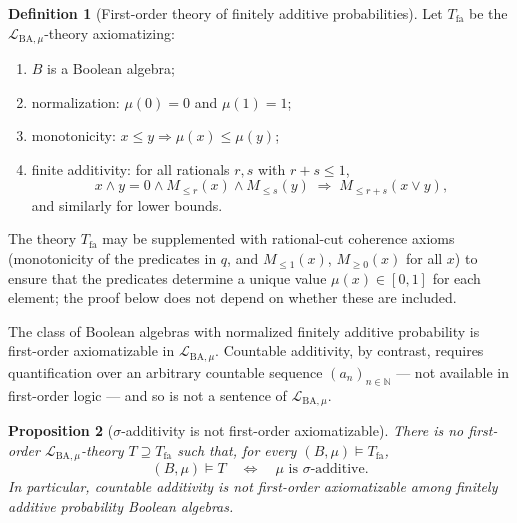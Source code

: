 \documentclass[11pt]{article}
\newtheorem{proposition}{Proposition}
\theoremstyle{definition}
\newtheorem{definition}[proposition]{Definition}
\newcommand{\Lmu}{\mathcal{L}_{\mathrm{BA},\mu}}
\newcommand{\Tfa}{T_{\mathrm{fa}}}
\newcommand{\N}{\mathbb{N}}
\begin{document}
\begin{definition}[First-order theory of finitely additive probabilities]
Let $\Tfa$ be the $\Lmu$-theory axiomatizing:
\begin{enumerate}[label=(\roman*)]
  \item $B$ is a Boolean algebra;
  \item normalization: $\mu(0) = 0$ and $\mu(1) = 1$;
  \item monotonicity: $x \leq y \Rightarrow \mu(x) \leq \mu(y)$;
  \item finite additivity: for all rationals $r, s$ with $r + s \leq 1$,
        \[
          x \wedge y = 0 \wedge M_{\leq r}(x) \wedge M_{\leq s}(y)
          \;\Rightarrow\; M_{\leq r+s}(x \vee y),
        \]
        and similarly for lower bounds.
\end{enumerate}
The theory $\Tfa$ may be supplemented with rational-cut coherence axioms
(monotonicity of the predicates in $q$, and $M_{\leq 1}(x)$, $M_{\geq 0}(x)$
for all $x$) to ensure that the predicates determine a unique value
$\mu(x) \in [0,1]$ for each element; the proof below does not depend on whether
these are included.
\end{definition}

\noindent
The class of Boolean algebras with normalized finitely additive probability is
first-order axiomatizable in $\Lmu$.  Countable additivity, by contrast, requires
quantification over an arbitrary countable sequence $(a_n)_{n \in \N}$ --- not
available in first-order logic --- and so is not a sentence of $\Lmu$.

\medskip

\begin{proposition}[$\sigma$-additivity is not first-order axiomatizable]
\label{prop:not-fo}
There is no first-order $\Lmu$-theory $T \supseteq \Tfa$ such that, for every
$(B, \mu) \models \Tfa$,
\[
  (B, \mu) \models T \quad\Longleftrightarrow\quad \mu \text{ is $\sigma$-additive}.
\]
In particular, countable additivity is not first-order axiomatizable among
finitely additive probability Boolean algebras.
\end{proposition}
\end{document}

